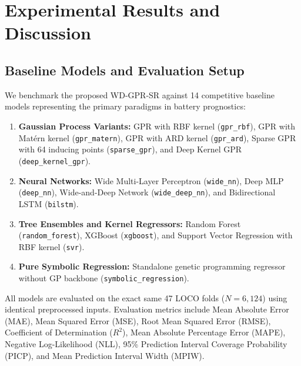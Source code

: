 \documentclass[a4paper,fleqn]{cas-sc}
\begin{document}
\section{Experimental Results and Discussion}

\subsection{Baseline Models and Evaluation Setup}
We benchmark the proposed WD-GPR-SR against 14 competitive baseline models representing the primary paradigms in battery prognostics:
\begin{enumerate}
    \item \textbf{Gaussian Process Variants:} GPR with RBF kernel (\texttt{gpr\_rbf}), GPR with Matérn kernel (\texttt{gpr\_matern}), GPR with ARD kernel (\texttt{gpr\_ard}), Sparse GPR with 64 inducing points (\texttt{sparse\_gpr}), and Deep Kernel GPR (\texttt{deep\_kernel\_gpr}).
    \item \textbf{Neural Networks:} Wide Multi-Layer Perceptron (\texttt{wide\_nn}), Deep MLP (\texttt{deep\_nn}), Wide-and-Deep Network (\texttt{wide\_deep\_nn}), and Bidirectional LSTM (\texttt{bilstm}).
    \item \textbf{Tree Ensembles and Kernel Regressors:} Random Forest (\texttt{random\_forest}), XGBoost (\texttt{xgboost}), and Support Vector Regression with RBF kernel (\texttt{svr}).
    \item \textbf{Pure Symbolic Regression:} Standalone genetic programming regressor without GP backbone (\texttt{symbolic\_regression}).
\end{enumerate}

All models are evaluated on the exact same 47 LOCO folds ($N=6,124$) using identical preprocessed inputs. Evaluation metrics include Mean Absolute Error (MAE), Mean Squared Error (MSE), Root Mean Squared Error (RMSE), Coefficient of Determination ($R^2$), Mean Absolute Percentage Error (MAPE), Negative Log-Likelihood (NLL), 95\% Prediction Interval Coverage Probability (PICP), and Mean Prediction Interval Width (MPIW).
\end{document}
